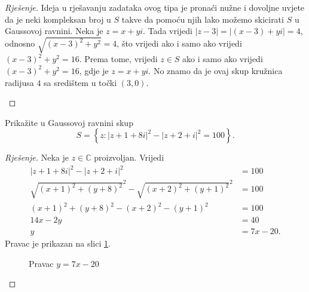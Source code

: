 \begin{proof}[Rješenje]
Ideja u rješavanju zadataka ovog tipa je pronaći nužne i dovoljne uvjete da je neki kompleksan broj u $S$ takve da pomoću njih lako možemo skicirati $S$ u Gaussovoj ravnini. Neka je $z=x+yi$. Tada vrijedi $|z-3|=|(x-3)+yi|=4$, odnosno $\sqrt{(x-3)^2+y^2}=4$, što vrijedi ako i samo ako vrijedi $(x-3)^2+y^2=16$. Prema tome, vrijedi $z\in S$ ako i samo ako vrijedi $(x-3)^2+y^2=16$, gdje je $z=x+yi$. No znamo da je ovaj skup kružnica radijusa $4$ sa središtem u točki $(3, 0)$.
\begin{figure}[ht]
\begin{center}
\end{center}
\end{figure}
\end{proof}
\begin{exercise}
Prikažite u Gaussovoj ravnini skup 
$$S=\left\{z : |z+1+8i|^2-|z+2+i|^2=100\right\}.$$
\end{exercise}
\begin{proof}[Rješenje]
Neka je $z\in \mathbb{C}$ proizvoljan. Vrijedi
\begin{align*}
|z+1+8i|^2-|z+2+i|^2&=100\\
\sqrt{(x+1)^2+(y+8)^2}^2-\sqrt{(x+2)^2+(y+1)^2}^2&=100\\
(x+1)^2+(y+8)^2-(x+2)^2-(y+1)^2&=100\\
14x-2y&=40\\
y&=7x-20.
\end{align*}
Pravac je prikazan na slici \ref{pravac}.
\begin{figure}[ht]
\begin{center}
\end{center}
\caption{Pravac $y=7x-20$}
\label{pravac}
\end{figure}
\end{proof}
